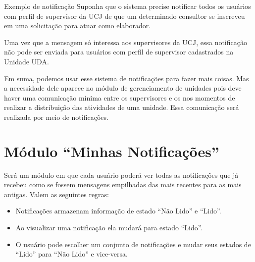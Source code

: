 \begin{exemplo}{Exemplo de notificação}
	Suponha que o sistema precise notificar todos os usuários com perfil de supervisor da UCJ de que um determinado consultor se inscreveu em uma solicitação para atuar como elaborador.
	
	\tcblower

	Uma vez que a mensagem só interessa aos supervisores da UCJ, essa notificação não pode ser enviada para usuários com perfil de supervisor cadastrados na Unidade UDA.
\end{exemplo}

Em suma, podemos usar esse sistema de notificações para fazer mais coisas. Mas a necessidade dele aparece  no módulo de gerenciamento de unidades pois deve haver uma comunicação mínima entre os supervisores e os \CLs nos momentos de realizar a distribuição das atividades de uma unidade. Essa comunicação será realizada por meio de notificações.

\section{Módulo ``Minhas Notificações''}

Será um módulo em que cada usuário poderá ver todas as notificações que já recebeu como se fossem mensagens empilhadas das mais recentes para as mais antigas. Valem as seguintes regras: 

\begin{itemize}
	\item Notificações armazenam informação de estado ``Não Lido'' e ``Lido''. 
	\item Ao visualizar uma notificação ela mudará para estado ``Lido''.
	\item O usuário pode escolher um conjunto de notificações e mudar seus estados de ``Lido'' para ``Não Lido'' e vice-versa.
\end{itemize}
